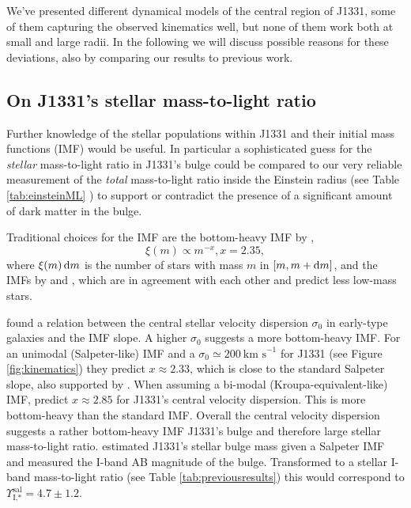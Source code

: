 We've presented different dynamical models of the central region of J1331, some of them capturing the observed kinematics well, but none of them work both at small and large radii. In the following we will discuss possible reasons for these deviations, also by comparing our results to previous work.

\subsection{On J1331's stellar mass-to-light ratio} \label{sec:MLdiscussion}

Further knowledge of the stellar populations within J1331 and their initial mass functions (IMF) would be useful. In particular a sophisticated guess for the \emph{stellar} mass-to-light ratio in J1331's bulge could be compared to our very reliable measurement of the \emph{total} mass-to-light ratio inside the Einstein radius (see Table \ref{tab:einsteinML} ) to support or contradict the presence of a significant amount of dark matter in the bulge.

Traditional choices for the IMF are the bottom-heavy IMF by \citet{Salpeter1955},
$$\xi(m) \propto m^{-x}, x=2.35,$$
where $\xi(m) \mathop{}\!\mathrm{d} m$ is the number of stars with mass $m$ in $[m,m+\mathop{}\!\mathrm{d} m]$, and the IMFs by \citet{2002Sci...295...82K} and \citet{Chabrier2003}, which are in agreement with each other and predict less low-mass stars.

\citet{Ferreras} found a relation between the central stellar velocity dispersion $\sigma_0$ in early-type galaxies and the IMF slope. A higher $\sigma_0$ suggests a more bottom-heavy IMF. For an unimodal (Salpeter-like) IMF and a $\sigma_0 \simeq 200~\text{km s}^{-1}$ for J1331 (see Figure \ref{fig:kinematics}) they predict $x \approx 2.33$, which is close to the standard Salpeter slope, also supported by \citet{2014MNRAS.438.1483S}. When assuming a bi-modal (Kroupa-equivalent-like) IMF, \citet{Ferreras} predict $x \approx 2.85$ for J1331's central velocity dispersion. This is more bottom-heavy than the standard \citet{2002Sci...295...82K} IMF. Overall the central velocity dispersion suggests a rather bottom-heavy IMF J1331's bulge and therefore large stellar mass-to-light ratio. \citet{SWELLSI} estimated J1331's stellar bulge mass given a Salpeter IMF and measured the I-band AB magnitude of the bulge. Transformed to a stellar I-band mass-to-light ratio (see Table \ref{tab:previousresults}) this would correspond to $\Upsilon_\text{I,*}^\text{sal} = 4.7 \pm 1.2$.

